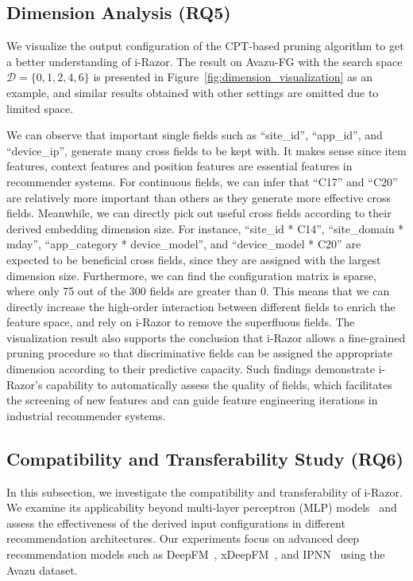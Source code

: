 \documentclass[10pt,journal,compsoc]{IEEEtran}
\begin{document}
\subsection{Dimension Analysis (RQ5)}
We visualize the output configuration of the CPT-based pruning algorithm to get a better understanding of i-Razor. The result on Avazu-FG with the search space $\mathcal{D}=\{0,1,2,4,6\}$ is presented in Figure~\ref{fig:dimension_visualization} as an example, and similar results obtained with other settings are omitted due to limited space.

We can observe that important single fields such as ``site\_id'', ``app\_id'', and ``device\_ip'', generate many cross fields to be kept with. It makes sense since item features, context features and position features are essential features in recommender systems. For continuous fields, we can infer that ``C17'' and ``C20'' are relatively more important than others as they generate more effective cross fields. Meanwhile, we can directly pick out useful cross fields according to their derived embedding dimension size. For instance, ``site\_id * C14'', ``site\_domain * mday'', ``app\_category * device\_model'',  and ``device\_model * C20'' are expected to be beneficial cross fields, since they are assigned with the largest dimension size. 
Furthermore, we can find the configuration matrix is sparse, where only 75 out of the 300 fields are greater than 0. This means that we can directly increase the high-order interaction between different  fields to enrich the feature space, and rely on i-Razor to remove the superfluous fields. 
The visualization result also supports the conclusion that i-Razor allows  a fine-grained pruning procedure so that discriminative fields can be assigned the appropriate dimension according to their predictive capacity.
Such findings demonstrate i-Razor's capability to automatically assess the quality of fields, which facilitates the screening of new features and can guide feature engineering iterations in industrial recommender systems.

\subsection{Compatibility and Transferability Study (RQ6)}
  In this subsection, we investigate the compatibility and transferability of i-Razor.
  We examine its applicability beyond multi-layer perceptron (MLP) models~\cite{covington2016deep} and assess the effectiveness of the derived input configurations in different recommendation architectures. Our experiments focus on advanced deep recommendation models such as DeepFM~\cite{guo2017deepfm}, xDeepFM~\cite{lian2018xdeepfm},  and IPNN~\cite{qu2016product,pin_2019} using the Avazu dataset.
\end{document}
